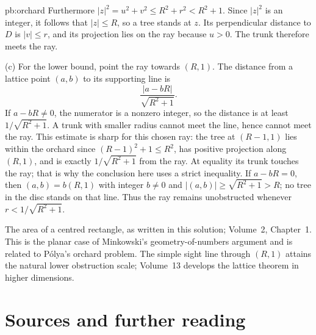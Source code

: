 \begin{solution}{pb:orchard}
Furthermore
$|z|^2=u^2+v^2\le R^2+r^2<R^2+1$. Since $|z|^2$ is an integer, it follows that $|z|\le R$, so a tree stands at $z$. Its perpendicular distance to $D$ is $|v|\le r$, and its projection lies on the ray because $u>0$. The trunk therefore meets the ray.

(c) For the lower bound, point the ray towards $(R,1)$. The distance from a lattice point $(a,b)$ to its supporting line is
\[
\frac{|a-bR|}{\sqrt{R^2+1}}.
\]
If $a-bR\ne0$, the numerator is a nonzero integer, so the distance is at least $1/\sqrt{R^2+1}$. A trunk with smaller radius cannot meet the line, hence cannot meet the ray. This estimate is sharp for this chosen ray: the tree at $(R-1,1)$ lies within the orchard since $(R-1)^2+1\le R^2$, has positive projection along $(R,1)$, and is exactly $1/\sqrt{R^2+1}$ from the ray. At equality its trunk touches the ray; that is why the conclusion here uses a strict inequality. If $a-bR=0$, then $(a,b)=b(R,1)$ with integer $b\ne0$ and
$|(a,b)|\ge\sqrt{R^2+1}>R$; no tree in the disc stands on that line. Thus the ray remains unobstructed whenever
$r<1/\sqrt{R^2+1}$.

\tools The area of a centred rectangle, as written in this solution; Volume~2, Chapter~1.
\leads This is the planar case of Minkowski's geometry-of-numbers argument and is related to Pólya's orchard problem. The simple sight line through $(R,1)$ attains the natural lower obstruction scale; Volume~13 develops the lattice theorem in higher dimensions.
\end{solution}

\section*{Sources and further reading}

